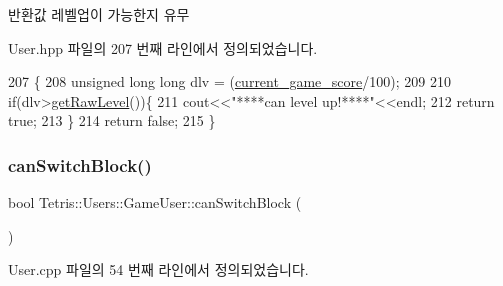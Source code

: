 \begin{DoxyReturn}{반환값}
레벨업이 가능한지 유무 
\end{DoxyReturn}


User.\+hpp 파일의 207 번째 라인에서 정의되었습니다.


\begin{DoxyCode}
207                              \{
208                 \textcolor{keywordtype}{unsigned} \textcolor{keywordtype}{long} \textcolor{keywordtype}{long} dlv = (\hyperlink{class_tetris_1_1_users_1_1_game_user_aae9d0156964b3872f7cd3917ae662ec2}{current\_game\_score}/100);
209                 
210                 \textcolor{keywordflow}{if}(dlv>\hyperlink{class_tetris_1_1_users_1_1_game_user_a3e232d2f4a0610e51136bec11453858b}{getRawLevel}())\{
211                     cout<<\textcolor{stringliteral}{"****can level up!****"}<<endl;
212                     \textcolor{keywordflow}{return} \textcolor{keyword}{true};
213                 \}
214                 \textcolor{keywordflow}{return} \textcolor{keyword}{false};
215             \}
\end{DoxyCode}
\mbox{\label{class_tetris_1_1_users_1_1_game_user_a8a777ef1ffbbc53ebae4172830863eb4}} 
\subsubsection{\texorpdfstring{can\+Switch\+Block()}{canSwitchBlock()}\hspace{0.1cm}{\footnotesize\ttfamily [1/2]}}
{\footnotesize\ttfamily bool Tetris\+::\+Users\+::\+Game\+User\+::can\+Switch\+Block (\begin{DoxyParamCaption}{ }\end{DoxyParamCaption})}



User.\+cpp 파일의 54 번째 라인에서 정의되었습니다.



